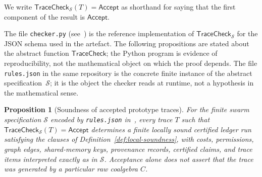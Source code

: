 \documentclass[a4paper,fleqn]{cas-sc}
\newtheorem{proposition}{Proposition}
\newcommand{\Accept}{\mathsf{Accept}}
\newcommand{\TraceCheck}{\mathsf{TraceCheck}}
\begin{document}
We write \(\TraceCheck_{\mathcal{S}}(T)=\Accept\) as shorthand for saying that the first component of the result is \(\Accept\).

The file \texttt{checker.py} (see~\cite{artifact2026}) is the reference implementation of \(\TraceCheck_{\mathcal{S}}\) for the JSON schema used in the artefact. The following propositions are stated about the abstract function \(\TraceCheck\); the Python program is evidence of reproducibility, not the mathematical object on which the proof depends. The file \texttt{rules.json} in the same repository is the concrete finite instance of the abstract specification~\(\mathcal{S}\); it is the object the checker reads at runtime, not a hypothesis in the mathematical sense.

\begin{proposition}[Soundness of accepted prototype traces]\label{prop:prototype-soundness}
For the finite swarm specification \(\mathcal{S}\) encoded by \texttt{rules.json} in~\cite{artifact2026}, every trace \(T\) such that \(\TraceCheck_{\mathcal{S}}(T)=\Accept\) determines a finite locally sound certified \emph{ledger run} satisfying the clauses of Definition~\ref{def:local-soundness}, with costs, permissions, graph edges, shared-memory keys, provenance records, certified claims, and trace items interpreted exactly as in \(\mathcal{S}\). Acceptance alone does not assert that the trace was generated by a particular raw coalgebra \(C\).
\end{proposition}
\end{document}
